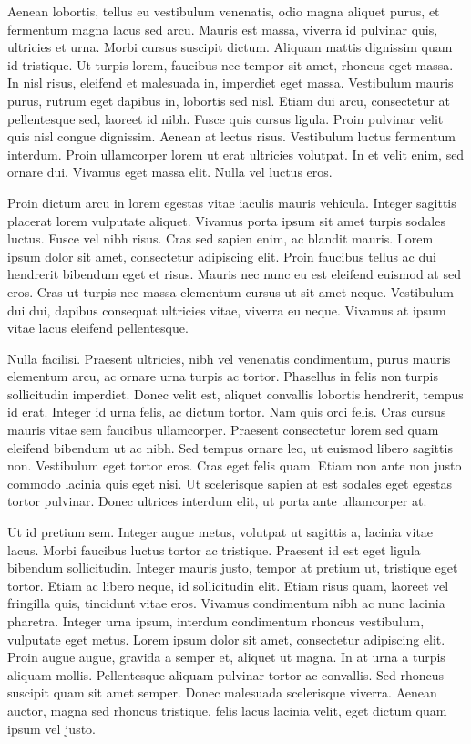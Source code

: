 \documentclass{article}
\begin{document}
Aenean lobortis, tellus eu vestibulum venenatis, odio magna aliquet purus, et
fermentum magna lacus sed arcu. Mauris est massa, viverra id pulvinar quis,
ultricies et urna. Morbi cursus suscipit dictum. Aliquam mattis dignissim quam
id tristique. Ut turpis lorem, faucibus nec tempor sit amet, rhoncus eget massa.
In nisl risus, eleifend et malesuada in, imperdiet eget massa. Vestibulum mauris
purus, rutrum eget dapibus in, lobortis sed nisl. Etiam dui arcu, consectetur at
pellentesque sed, laoreet id nibh. Fusce quis cursus ligula. Proin pulvinar
velit quis nisl congue dignissim. Aenean at lectus risus. Vestibulum luctus
fermentum interdum. Proin ullamcorper lorem ut erat ultricies volutpat. In et
velit enim, sed ornare dui. Vivamus eget massa elit. Nulla vel luctus eros.

Proin dictum arcu in lorem egestas vitae iaculis mauris vehicula. Integer
sagittis placerat lorem vulputate aliquet. Vivamus porta ipsum sit amet turpis
sodales luctus. Fusce vel nibh risus. Cras sed sapien enim, ac blandit mauris.
Lorem ipsum dolor sit amet, consectetur adipiscing elit. Proin faucibus tellus
ac dui hendrerit bibendum eget et risus. Mauris nec nunc eu est eleifend euismod
at sed eros. Cras ut turpis nec massa elementum cursus ut sit amet neque.
Vestibulum dui dui, dapibus consequat ultricies vitae, viverra eu neque. Vivamus
at ipsum vitae lacus eleifend pellentesque.

Nulla facilisi. Praesent ultricies, nibh vel venenatis condimentum, purus mauris
elementum arcu, ac ornare urna turpis ac tortor. Phasellus in felis non turpis
sollicitudin imperdiet. Donec velit est, aliquet convallis lobortis hendrerit,
tempus id erat. Integer id urna felis, ac dictum tortor. Nam quis orci felis.
Cras cursus mauris vitae sem faucibus ullamcorper. Praesent consectetur lorem
sed quam eleifend bibendum ut ac nibh. Sed tempus ornare leo, ut euismod libero
sagittis non. Vestibulum eget tortor eros. Cras eget felis quam. Etiam non ante
non justo commodo lacinia quis eget nisi. Ut scelerisque sapien at est sodales
eget egestas tortor pulvinar. Donec ultrices interdum elit, ut porta ante
ullamcorper at.

Ut id pretium sem. Integer augue metus, volutpat ut sagittis a, lacinia vitae
lacus. Morbi faucibus luctus tortor ac tristique. Praesent id est eget ligula
bibendum sollicitudin. Integer mauris justo, tempor at pretium ut, tristique
eget tortor. Etiam ac libero neque, id sollicitudin elit. Etiam risus quam,
laoreet vel fringilla quis, tincidunt vitae eros. Vivamus condimentum nibh ac
nunc lacinia pharetra. Integer urna ipsum, interdum condimentum rhoncus
vestibulum, vulputate eget metus. Lorem ipsum dolor sit amet, consectetur
adipiscing elit. Proin augue augue, gravida a semper et, aliquet ut magna. In at
urna a turpis aliquam mollis. Pellentesque aliquam pulvinar tortor ac convallis.
Sed rhoncus suscipit quam sit amet semper. Donec malesuada scelerisque viverra.
Aenean auctor, magna sed rhoncus tristique, felis lacus lacinia velit, eget
dictum quam ipsum vel justo.
\end{document}
